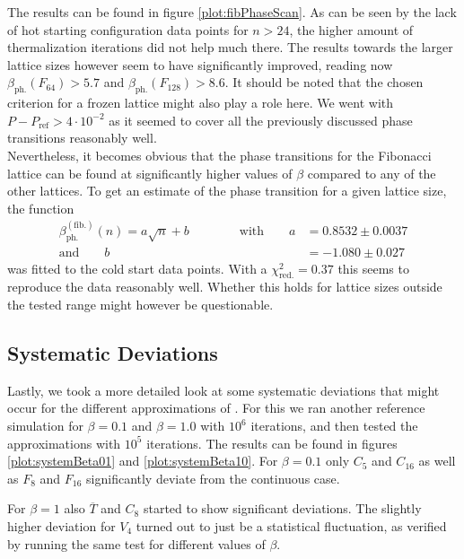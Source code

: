 The results can be found in figure \ref{plot:fibPhaseScan}. As can be seen by the lack of hot starting configuration data points for $ n > 24 $, the higher amount of thermalization iterations did not help much there. The results towards the larger lattice sizes however seem to have significantly improved, reading now $\beta_{\textrm{ph.}}(F_{64}) > 5.7$ and $\beta_{\textrm{ph.}}(F_{128}) > 8.6$. It should be noted that the chosen criterion for a frozen lattice might also play a role here. We went with $P-P_{\textrm{ref}} > 4 \cdot 10^{-2}$ as it seemed to cover all the previously discussed phase transitions reasonably well.\\

Nevertheless, it becomes obvious that the phase transitions for the Fibonacci lattice can be found at significantly higher values of $\beta$ compared to any of the other lattices. To get an estimate of the phase transition for a given lattice size, the function
\begin{align*}
  \beta_{\textrm{ph.}}^{(\textrm{fib.})}(n) = a \sqrt{n} + b \qquad \qquad  \textrm{with} \qquad a &= 0.8532 \pm 0.0037\\
  \textrm{and} \qquad b &= -1.080 \pm 0.027
\end{align*}
was fitted to the cold start data points. With a $\chi_{\textrm{red.}}^2 = 0.37$ this seems to reproduce the data reasonably well. Whether this holds for lattice sizes outside the tested range might however be questionable.

\subsection{Systematic Deviations}
\FloatBarrier

Lastly, we took a more detailed look at some systematic deviations that might occur for the different approximations of \SUTwo. For this we ran another reference simulation for $\beta = 0.1$ and $\beta = 1.0$ with $10^6$ iterations, and then tested the approximations with $10^5$ iterations. The results can be found in figures \ref{plot:systemBeta01} and \ref{plot:systemBeta10}. For $\beta=0.1$ only $C_5$ and $C_{16}$ as well as $F_{8}$ and $F_{16}$ significantly deviate from the continuous case.

For $\beta=1$ also $\overline{T}$ and $C_8$ started to show significant deviations. The slightly higher deviation for $V_4$ turned out to just be a statistical fluctuation, as verified by running the same test for different values of $\beta$.\\

